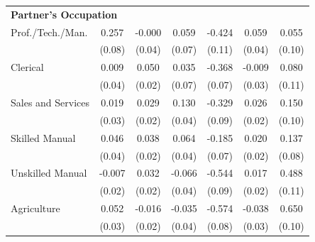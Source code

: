 \begin{longtable}{l*{6}{c}}
\multicolumn{7}{l}{\textbf{Partner's Occupation}} \\
Prof./Tech./Man.   & 0.257\sym{***} & -0.000 & 0.059 & -0.424\sym{***} & 0.059 & 0.055 \\
                    & (0.08) & (0.04) & (0.07) & (0.11) & (0.04) & (0.10) \\
Clerical           & 0.009 & 0.050\sym{**} & 0.035 & -0.368\sym{***} & -0.009 & 0.080 \\
                    & (0.04) & (0.02) & (0.07) & (0.07) & (0.03) & (0.11) \\
Sales and Services & 0.019 & 0.029 & 0.130\sym{***} & -0.329\sym{***} & 0.026 & 0.150 \\
                    & (0.03) & (0.02) & (0.04) & (0.09) & (0.02) & (0.10) \\
Skilled Manual     & 0.046 & 0.038\sym{**} & 0.064\sym{*} & -0.185\sym{***} & 0.020 & 0.137\sym{*} \\
                    & (0.04) & (0.02) & (0.04) & (0.07) & (0.02) & (0.08) \\
Unskilled Manual   & -0.007 & 0.032\sym{*} & -0.066\sym{*} & -0.544\sym{***} & 0.017 & 0.488\sym{***} \\
                    & (0.02) & (0.02) & (0.04) & (0.09) & (0.02) & (0.11) \\
Agriculture        & 0.052\sym{*} & -0.016 & -0.035 & -0.574\sym{***} & -0.038 & 0.650\sym{***} \\
                    & (0.03) & (0.02) & (0.04) & (0.08) & (0.03) & (0.10) \\


\end{longtable}
